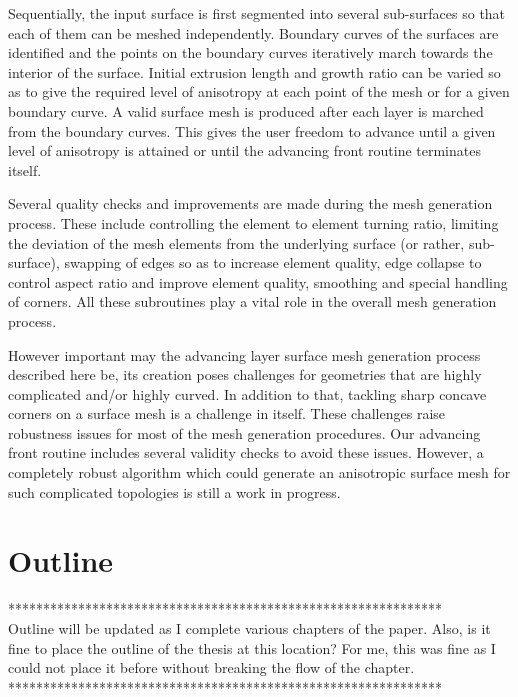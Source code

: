 Sequentially, the input surface is first segmented into several sub-surfaces so that each of them can be meshed independently. Boundary curves of the surfaces are identified and the points on the boundary curves iteratively march towards the interior of the surface. Initial extrusion length and growth ratio can be varied so as to give the required level of anisotropy at each point of the mesh or for a given boundary curve. A valid surface mesh is produced after each layer is marched from the boundary curves. This gives the user freedom to advance until a given level of anisotropy is attained or until the advancing front routine terminates itself. 

Several quality checks and improvements are made during the mesh generation process. These include controlling the element to element turning ratio, limiting the deviation of the mesh elements from the underlying surface (or rather, sub-surface), swapping of edges so as to increase element quality, edge collapse to control aspect ratio and improve element quality, smoothing and special handling of corners. All these subroutines play a vital role in the overall mesh generation process.

However important may the advancing layer surface mesh generation process described here be, its creation poses challenges for geometries that are highly complicated and/or highly curved. In addition to that, tackling sharp concave corners on a surface mesh is a challenge in itself. These challenges raise robustness issues for most of the mesh generation procedures. Our advancing front routine includes several validity checks to avoid these issues. However, a completely robust algorithm which could generate an anisotropic surface mesh for such complicated topologies is still a work in progress.

\section{Outline}

************************************************************** \\
Outline will be updated as I complete various chapters of the paper.
Also, is it fine to place the outline of the thesis at this location? For me, this was fine as I could not place it before without breaking the flow of the chapter. \\
**************************************************************

